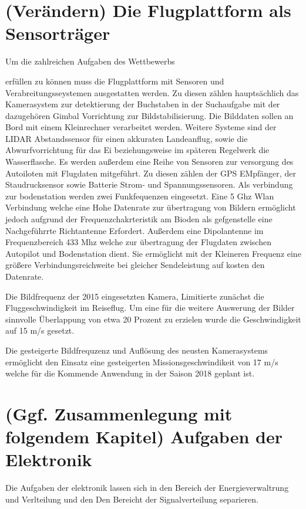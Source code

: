 \section{(Verändern) Die Flugplattform als Sensorträger}

Um die zahlreichen Aufgaben des Wettbewerbs \begin{comment} Verweis auf Wettbewerbsaufben \end{comment}
erfüllen zu können muss die Flugplattform mit Sensoren und Verabreitungsseystemen ausgestatten werden.
Zu diesen zählen hauptsächlich das Kamerasystem zur detektierung der Buchstaben in der Suchaufgabe mit der dazugehören
Gimbal Vorrichtung zur Bildstabilisierung. Die Bilddaten sollen an Bord mit einem Kleinrechner  verarbeitet werden. Weitere Systeme sind der LIDAR Abstandssensor für einen akkuraten Landeanflug, sowie die Abwurfvorrichtung für das Ei beziehungsweise im späteren Regelwerk die Wasserflasche.
Es werden außerdem eine Reihe von Sensoren zur versorgung des Autoiloten mit Flugdaten mitgeführt. Zu diesen zählen der GPS EMpfänger, der Staudrucksensor sowie Batterie Strom- und Spannungssensoren.
Als verbindung zur bodenstation werden zwei Funkfequenzen eingesetzt.
Eine 5 Ghz Wlan Verbindung welche eine Hohe Datenrate zur übertragung von Bildern  ermöglicht jedoch aufgrund der Frequenzchakrteristik am Bioden als gefgenstelle eine Nachgeführrte Richtantenne Erfordert.
Außerdem eine Dipolantenne im Frequenzbereich 433 Mhz welche zur übertragung der Flugdaten zwischen Autopilot und Bodenstation dient. Sie ermöglicht mit der Kleineren Frequenz eine größere Verbindungsreichweite bei gleicher Sendeleistung auf kosten den Datenrate.

Die Bildfrequenz der 2015 eingesetzten Kamera, Limitierte zunächst die Fluggeschwindigkeit im Reiseflug. Um eine für die weitere Auswerung der Bilder sinnvolle Überlappung von etwa 20 Prozent zu erzielen wurde die Geschwindigkeit auf 15 m/s gesetzt.

Die gesteigerte Bildfrequzenz und Auflösung des neusten Kamerasystems ermöglicht den Einsatz eine gesteigerten Missionsgeschwindikeit von 17 m/s welche für die Kommende Anwendung in der Saison 2018 geplant ist.

\section{(Ggf. Zusammenlegung mit folgendem Kapitel) Aufgaben der Elektronik}

Die Aufgaben der elektronik lassen sich in den Bereich der Energieverwaltrung und Verlteilung  und den Den Bereicht der Signalverteilung separieren.

